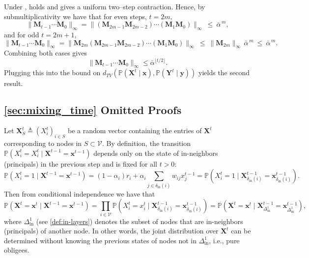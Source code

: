 \documentclass[mnsc,nonblindrev]{informs3}
\renewcommand{\Pr}{\mathbb{P}}
\newcommand{\din}{\delta_{\text{in}}}
\newcommand{\Xvec}{\mathbf{X}}
\newcommand{\xvec}{\mathbf{x}}
\newcommand{\Yvec}{\mathbf{Y}}
\newcommand{\yvec}{\mathbf{y}}
\newcommand{\M}{\mathbf{M}}
\newcommand{\Deltain}{\Delta_{\text{in}}}
\renewenvironment{proof}[1][Proof]{%
  \par\noindent{\itshape #1.} \ignorespaces
}{%
  \hfill\Halmos\par
}
\begin{document}
\begin{APPENDICES}
\begin{proof}
Under ,  holds and gives a uniform two–step contraction. Hence, by submultiplicativity we have that for even steps, $t=2m$,
\[
\|\M_{t-1} \cdots \M_0\|_\infty
=\|( \M_{2m-1} \M_{2m-2})\cdots(\M_1 \M_0)\|_\infty
\ \le\ \bar\alpha^{\,m},
\]
and for odd $t=2m{+}1$,
\[
\|\M_{t-1} \cdots \M_0\|_\infty
=\|\M_{2m}(\M_{2m-1} \M_{2m-2})\cdots(\M_1\M_0)\|_\infty
\ \le\ \|\M_{2m}\|_\infty\,\bar\alpha^{\,m}\ \le\ \bar\alpha^{\,m}.
\]
Combining both cases gives
\[
\|\M_{t-1}\cdots \M_0\|_\infty \le \bar\alpha^{\lfloor t/2\rfloor}.
\]
Plugging this into the bound on $d_{TV}(\Pr(\Xvec^t \mid \xvec), \Pr(\Yvec^t \mid \yvec))$ yields the second result.
\end{proof}


\subsection{\cref{sec:mixing_time} Omitted Proofs}
\label{app:mixing_time}


\MixingDAG*
\begin{proof}
Let $\Xvec^t_S \triangleq (X^t_i)_{i\in S}$ be a random vector containing the entries of $\Xvec^t$ corresponding to nodes in $S\subset\mathcal{V}$.
By definition, the transition $\Pr(X_i^t=X_i^t \mid \Xvec^{t-1}=\xvec^{t-1})$ depends only on the state of in-neighbors (principals) in the previous step and is fixed for all $t>0$:
\[
    \Pr(X_i^t=1 \mid \Xvec^{t-1}=\xvec^{t-1}) = (1-\alpha_i)r_i + \alpha_i \sum_{j\in\din(i)} w_{ij} x_j^{t-1} = \Pr(X_i^t=1 \mid \Xvec^{t-1}_{\din(i)} = \xvec^{t-1}_{\din(i)}).
\]
Then from conditional independence we have that
\[
    \Pr(\Xvec^t=\xvec^t \mid \Xvec^{t-1}=\xvec^{t-1})
    = \prod_{i\in\mathcal{V}} \Pr(X_i^t=x_i^t \mid \Xvec^{t-1}_{\din(i)} = \xvec^{t-1}_{\din(i)})
    = \Pr(\Xvec^t=\xvec^t \mid \Xvec^{t-1}_{\Deltain^1}=\xvec^{t-1}_{\Deltain^1}),
\]
where $\Deltain^1$ (see \cref{def:in-layers}) denotes the subset of nodes that are in-neighbors (principals) of another node.
In other words, the joint distribution over $\Xvec^t$ can be determined without knowing the previous states of nodes not in $\Deltain^1$, i.e., pure obligees.


\end{proof}
\end{APPENDICES}
\end{document}
